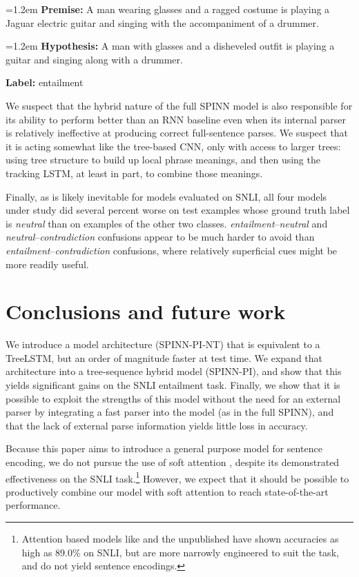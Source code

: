 \documentclass[11pt]{article}
\newcommand{\snli}[3]{{\vspace{0.25em}
{\small \setlength{\parindent}{0.6em} \hangindent=1.2em  \textbf{Premise:} #1\par}\vspace{0.25em}
{\small \setlength{\parindent}{0.6em} \hangindent=1.2em   \textbf{Hypothesis:} #2\par}\vspace{0.25em}
{\small \setlength{\parindent}{0.6em}  \textbf{Label:} #3\par}
}}
\begin{document}
\snli
{A man wearing glasses and a ragged costume is playing a Jaguar electric guitar and singing with the accompaniment of a drummer.}
{A man with glasses and a disheveled outfit is playing a guitar and singing along with a drummer.}
{entailment}

We suspect that the hybrid nature of the full SPINN model is also responsible for its ability to perform better than an RNN baseline even when its internal parser is relatively ineffective at producing correct full-sentence parses. We suspect that it is acting somewhat like the tree-based CNN, only with access to larger trees: using tree structure to build up local phrase meanings, and then using the tracking LSTM, at least in part, to combine those meanings.

Finally, as is likely inevitable for models evaluated on SNLI, all four models under study did several percent worse on test examples whose ground truth label is \textit{neutral} than on examples of the other two classes. \textit{entailment}--\textit{neutral} and \textit{neutral}--\textit{contradiction} confusions appear to be much harder to avoid than \textit{entailment}--\textit{contradiction} confusions, where relatively superficial cues might be more readily useful.

\section{Conclusions and future work}

We introduce a model architecture (SPINN-PI-NT) that is equivalent to a TreeLSTM, but an order of magnitude faster at test time. We expand that architecture into a tree-sequence hybrid model (SPINN-PI), and show that this yields significant gains on the SNLI entailment task. Finally, we show that it is possible to exploit the strengths of this model without the need for an external parser by integrating a fast parser into the model (as in the full SPINN), and that the lack of external parse information yields little loss in accuracy.

Because this paper aims to introduce a general purpose model for sentence encoding, we do not pursue the use of soft attention \citep{bahdanau2014neural,rocktaschel2015reasoning}, despite its demonstrated effectiveness on the SNLI task.\footnote{Attention based models like \citet{rocktaschel2015reasoning} and the unpublished \citet{cheng2016long} have shown accuracies as high as 89.0\% on SNLI, but are more narrowly engineered to suit the task, and do not yield sentence encodings.} However, we expect that it should be possible to productively combine our model with soft attention to reach state-of-the-art performance.
\end{document}
